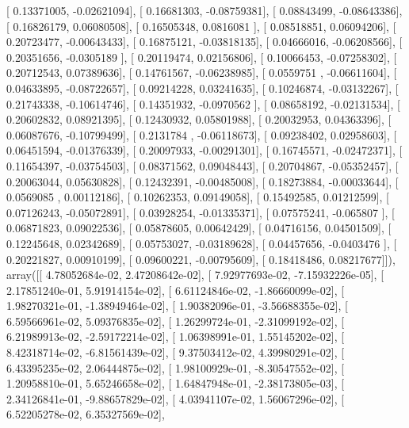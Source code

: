 \documentclass{article}
\begin{document}
       [ 0.13371005, -0.02621094],
       [ 0.16681303, -0.08759381],
       [ 0.08843499, -0.08643386],
       [ 0.16826179,  0.06080508],
       [ 0.16505348,  0.0816081 ],
       [ 0.08518851,  0.06094206],
       [ 0.20723477, -0.00643433],
       [ 0.16875121, -0.03818135],
       [ 0.04666016, -0.06208566],
       [ 0.20351656, -0.0305189 ],
       [ 0.20119474,  0.02156806],
       [ 0.10066453, -0.07258302],
       [ 0.20712543,  0.07389636],
       [ 0.14761567, -0.06238985],
       [ 0.0559751 , -0.06611604],
       [ 0.04633895, -0.08722657],
       [ 0.09214228,  0.03241635],
       [ 0.10246874, -0.03132267],
       [ 0.21743338, -0.10614746],
       [ 0.14351932, -0.0970562 ],
       [ 0.08658192, -0.02131534],
       [ 0.20602832,  0.08921395],
       [ 0.12430932,  0.05801988],
       [ 0.20032953,  0.04363396],
       [ 0.06087676, -0.10799499],
       [ 0.2131784 , -0.06118673],
       [ 0.09238402,  0.02958603],
       [ 0.06451594, -0.01376339],
       [ 0.20097933, -0.00291301],
       [ 0.16745571, -0.02472371],
       [ 0.11654397, -0.03754503],
       [ 0.08371562,  0.09048443],
       [ 0.20704867, -0.05352457],
       [ 0.20063044,  0.05630828],
       [ 0.12432391, -0.00485008],
       [ 0.18273884, -0.00033644],
       [ 0.0569085 ,  0.00112186],
       [ 0.10262353,  0.09149058],
       [ 0.15492585,  0.01212599],
       [ 0.07126243, -0.05072891],
       [ 0.03928254, -0.01335371],
       [ 0.07575241, -0.065807  ],
       [ 0.06871823,  0.09022536],
       [ 0.05878605,  0.00642429],
       [ 0.04716156,  0.04501509],
       [ 0.12245648,  0.02342689],
       [ 0.05753027, -0.03189628],
       [ 0.04457656, -0.0403476 ],
       [ 0.20221827,  0.00910199],
       [ 0.09600221, -0.00795609],
       [ 0.18418486,  0.08217677]]), array([[  4.78052684e-02,   2.47208642e-02],
       [  7.92977693e-02,  -7.15932226e-05],
       [  2.17851240e-01,   5.91914154e-02],
       [  6.61124846e-02,  -1.86660099e-02],
       [  1.98270321e-01,  -1.38949464e-02],
       [  1.90382096e-01,  -3.56688355e-02],
       [  6.59566961e-02,   5.09376835e-02],
       [  1.26299724e-01,  -2.31099192e-02],
       [  6.21989913e-02,  -2.59172214e-02],
       [  1.06398991e-01,   1.55145202e-02],
       [  8.42318714e-02,  -6.81561439e-02],
       [  9.37503412e-02,   4.39980291e-02],
       [  6.43395235e-02,   2.06444875e-02],
       [  1.98100929e-01,  -8.30547552e-02],
       [  1.20958810e-01,   5.65246658e-02],
       [  1.64847948e-01,  -2.38173805e-03],
       [  2.34126841e-01,  -9.88657829e-02],
       [  4.03941107e-02,   1.56067296e-02],
       [  6.52205278e-02,   6.35327569e-02],
\end{document}
